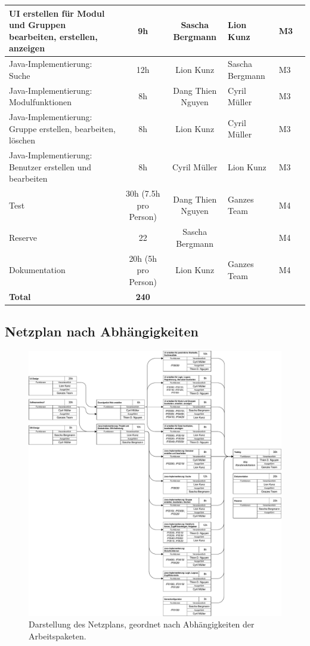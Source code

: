 \begin{landscape}
\begin{tabularx}{\linewidth}{|X|c|c|l|l|c|}
UI erstellen für Modul und Gruppen bearbeiten, erstellen, anzeigen		&	9h	&	Sascha Bergmann	&	Lion Kunz&	M3\\ \hline
Java-Implementierung: Suche 											&	12h	&	Lion Kunz		&	Sascha Bergmann&	M3\\ \hline
Java-Implementierung: Modulfunktionen 									&	8h	&	Dang Thien Nguyen&	Cyril Müller&	M3\\ \hline
Java-Implementierung: Gruppe erstellen, bearbeiten, löschen 			&	8h	&	Lion Kunz		&	Cyril Müller&	M3\\ \hline
Java-Implementierung: Benutzer erstellen und bearbeiten 				&	8h	&	Cyril Müller	&	Lion Kunz&	M3\\ \hline
Test 																	&	30h (7.5h pro Person)	&	Dang Thien Nguyen&	Ganzes Team&	M4\\ \hline
Reserve 																&	22	&	Sascha Bergmann	&	&	M4\\ \hline
Dokumentation 															&	20h (5h pro Person)&	Lion Kunz		&	Ganzes Team&	M4\\ \hline
\textbf{Total}																	&	\textbf{240}	&		&	&	\\ \hline
\end{tabularx}
\end{landscape}


\subsection{Netzplan nach Abhängigkeiten}
\label{sec:netzplan_abhaengigkeiten}
\begin{figure}[H]
\includegraphics[width=1.1\linewidth]{graphics/netzplan_s1.pdf}
\caption{Darstellung des Netzplans, geordnet nach Abhängigkeiten der Arbeitspaketen.}
\end{figure}